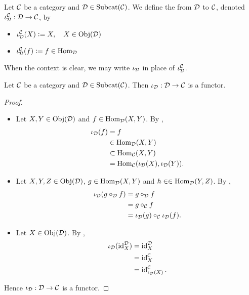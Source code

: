 \documentclass{book}
\begin{document}
	\begin{defn}
		Let $\mathcal{C}$ be a category and $\mathcal{D} \in \operatorname{Subcat}(\mathcal{C})$. We define the  from $\mathcal{D}$ to $\mathcal{C}$, denoted $\iota_{\mathcal{D}}^{\mathcal{C}}:\mathcal{D} \rightarrow \mathcal{C}$, by 
		\begin{itemize}
			\item $\iota_{\mathcal{D}}^{\mathcal{C}}(X) \vcentcolon= X, \quad X \in \operatorname{Obj}(\mathcal{D})$
			\item $\iota_{\mathcal{D}}^{\mathcal{C}}(f) \vcentcolon= f \in \operatorname{Hom}_{\mathcal{D}}$
		\end{itemize}
	\end{defn}
	
	\begin{note}
		When the context is clear, we may write $\iota_{\mathcal{D}}$ in place of $\iota_{\mathcal{D}}^{\mathcal{C}}$.
	\end{note}
	
	\begin{ex}
		Let $\mathcal{C}$ be a category and $\mathcal{D} \in \operatorname{Subcat}(\mathcal{C})$. Then $\iota_{\mathcal{D}}:\mathcal{D} \rightarrow \mathcal{C}$ is a functor. 
	\end{ex}
	
	\begin{proof}\
		\begin{itemize}
			\item Let $X, Y \in \operatorname{Obj}(\mathcal{D})$ and $f \in \operatorname{Hom}_{\mathcal{D}}(X,Y)$. By ,
			\begin{align*}
				\iota_{\mathcal{D}}(f)
				& = f \\
				& \in \operatorname{Hom}_{\mathcal{D}}(X,Y) \\
				& \subset \operatorname{Hom}_{\mathcal{C}}(X,Y) \\
				& = \operatorname{Hom}_{\mathcal{C}}(\iota_{\mathcal{D}}(X), \iota_{\mathcal{D}}(Y)).
			\end{align*}
			\item Let $X,Y,Z \in \operatorname{Obj}(\mathcal{D})$, $g \in \operatorname{Hom}_{\mathcal{D}}(X,Y)$ and $h \in \in \operatorname{Hom}_{\mathcal{D}}(Y,Z)$. By ,
			\begin{align*}
				\iota_{\mathcal{D}}(g \circ_{\mathcal{D}} f)
				& = g \circ_{\mathcal{D}} f \\
				& = g \circ_{\mathcal{C}} f \\
				& = \iota_{\mathcal{D}}(g) \circ_{\mathcal{C}} \iota_{\mathcal{D}}(f).
			\end{align*}
			\item Let $X \in \operatorname{Obj}(\mathcal{D})$. By ,
			\begin{align*}
				\iota_{\mathcal{D}}(\operatorname{id}_X^{\mathcal{D}})
				& = \operatorname{id}_X^{\mathcal{D}} \\
				& = \operatorname{id}_X^{\mathcal{C}} \\
				& = \operatorname{id}_{\iota_{\mathcal{D}}(X)}^{\mathcal{C}}.
			\end{align*}
		\end{itemize}
		Hence $\iota_{\mathcal{D}}:\mathcal{D} \rightarrow \mathcal{C}$ is a functor. 
	\end{proof}
	
\end{document}
